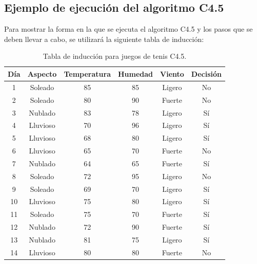 \subsection{Ejemplo de ejecución del algoritmo C4.5}
Para mostrar la forma en la que se ejecuta el algoritmo C4.5 y los pasos que se deben llevar a cabo, se utilizará la siguiente tabla de inducción:

\begin{table}[H]
	\begin{center}
		\label{tab:tablaInduccionC4.5}
		\begin{tabular}{c|c|c|c|c|c}
			\textbf{Día} & \textbf{Aspecto} & \textbf{Temperatura} & \textbf{Humedad} & \textbf{Viento} & \textbf{Decisión}\\
			\hline
			1 & Soleado & 85 & 85 & Ligero & No\\
			2 & Soleado & 80 & 90 & Fuerte & No\\
			3 & Nublado & 83 & 78 & Ligero & Sí\\
			4 & Lluvioso & 70 & 96 & Ligero & Sí\\
			5 & Lluvioso & 68 & 80 & Ligero & Sí\\
			6 & Lluvioso & 65 & 70 & Fuerte & No\\
			7 & Nublado & 64 & 65 & Fuerte & Sí\\
			8 & Soleado & 72 & 95 & Ligero & No\\
			9 & Soleado & 69 & 70 & Ligero & Sí\\
			10 & Lluvioso & 75 & 80 & Ligero & Sí\\
			11 & Soleado & 75 & 70 & Fuerte & Sí\\
			12 & Nublado & 72 & 90 & Fuerte & Sí\\
			13 & Nublado & 81 & 75 & Ligero & Sí\\
			14 & Lluvioso & 80 & 80 & Fuerte & No\\
		\end{tabular}
	\end{center}
	\caption{Tabla de inducción para juegos de tenis C4.5.}
\end{table}

